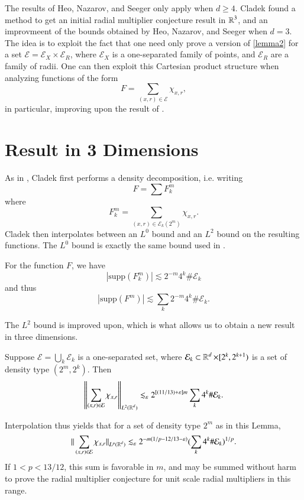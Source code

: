 The results of Heo, Nazarov, and Seeger only apply when $d \geq 4$. Cladek found a method to get an initial radial multiplier conjecture result in $\operatorname{\mathbb{R}}^3$, and an improvmeent of the bounds obtained by Heo, Nazarov, and Seeger when $d = 3$. The idea is to exploit the fact that one need only prove a version of \ref{lemma2} for a set $\mathcal{E} = \mathcal{E}_X \times \mathcal{E}_R$, where $\mathcal{E}_X$ is a one-separated family of points, and $\mathcal{E}_R$ are a family of radii. One can then exploit this Cartesian product structure when analyzing functions of the form
%
\[ F = \sum_{(x,r) \in \mathcal{E}} \chi_{x,r}, \]
%
in particular, improving upon the result of \cite{HeoandNazarovandSeeger}.

\section{Result in 3 Dimensions}

As in \cite{HeoandNazarovandSeeger}, Cladek first performs a density decomposition, i.e. writing
%
\[ F = \sum F_k^m \]
%
where
%
\[ F_k^m = \sum_{(x,r) \in \mathcal{E}_k(2^m)} \chi_{x,r}. \]
%
Cladek then interpolates between an $L^0$ bound and an $L^2$ bound on the resulting functions. The $L^0$ bound is exactly the same bound used in \cite{HeoandNazarovandSeeger}.

\begin{theorem}
    For the function $F$, we have
    \[ |\text{supp}(F_k^m)| \lesssim 2^{-m} 4^k \# \mathcal{E}_k \]
    and thus
    \[ |\text{supp}(F^m)| \lesssim \sum_k 2^{-m} 4^k \# \mathcal{E}_k. \]
\end{theorem}

The $L^2$ bound is improved upon, which is what allows us to obtain a new result in three dimensions.

\begin{lemma} \label{cladeksl2}
    Suppose $\mathcal{E} = \bigcup_k \mathcal{E}_k$ is a one-separated set, where $\mathcal{E}_k \subset \operatorname{\mathbb{R}}^d \times [2^k,2^{k+1})$ is a set of density type $(2^m, 2^k)$. Then
    \[ \left\| \sum_{(x,r) \in \mathcal{E}} \chi_{x,r} \right\|_{L^2(\operatorname{\mathbb{R}}^d)} \lesssim_\varepsilon 2^{[(11/13) + \varepsilon] m} \sum_k 4^k \# \mathcal{E}_k. \]
\end{lemma}

Interpolation thus yields that for a set of density type $2^m$ as in this Lemma,
%
\[ \| \sum_{(x,r) \in \mathcal{E}} \chi_{x,r} \|_{L^p(\operatorname{\mathbb{R}}^d)} \lesssim_\varepsilon 2^{-m(1/p - 12/13 - \varepsilon)} ( \sum_k 4^k \# \mathcal{E}_k )^{1/p}. \]
%
If $1 < p < 13/12$, this sum is favorable in $m$, and may be summed without harm to prove the radial multiplier conjecture for unit scale radial multipliers in this range.

